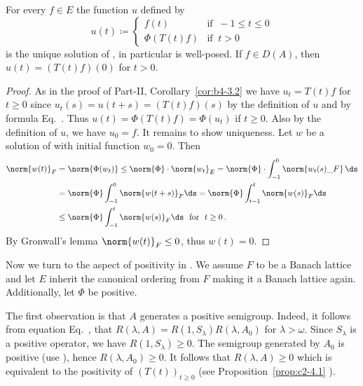 \begin{corollary}\label{cor:c4-3.2}
%
For every $f \in E$ the function $u$ defined by
\begin{equation}\label{eq:c4-3.5}
u(t) \coloneqq  \begin{cases}
    f(t) & \text{if } \ -1 \leq t \leq 0 \\
    \Phi(T(t)f) & \text{if } \ t > 0
\end{cases}
\end{equation}
is the unique solution of , in particular  is well-posed.
If\/ $f \in D(A)$, then $u(t) = (T(t)f)(0)$ for $t > 0$.
\end{corollary}
\begin{proof}
As in the proof of Part-II, Corollary~\ref{cor:b4-3.2} we have $u_t = T(t)f$ for $t \geq 0$ since $u_t(s) = u(t+s) = (T(t)f)(s)$ by the definition of\/ $u$ and by formula Eq.~.
Thus $u(t) = \Phi(T(t)f) = \Phi(u_t)$ if\/ $t \geq 0$.
Also by the definition of\/ $u$, we have $u_{0} = f$.
It remains to show uniqueness.
Let $w$ be a solution of  with initial function $w_{0} = 0$.
Then
\begin{align*}
\norm{w(t)}_F & = \norm{\Phi(w_{t})} \leq \norm{\Phi} \cdot  \norm{w_{t}}_{E} =  \norm{\Phi} \cdot \int_{-1}^{0} \norm{w_{t}(s)\_{F}} \, \ds \\
&=  \norm{\Phi} \int_{-1}^0 \norm{w(t+s)}_{F} \ds = \norm{\Phi} \int_{t-1}^{t} \norm{w(s)}_{F} \ds \\
&\leq \norm{\Phi} \int_{-1}^{t} \norm{w(s)}_{F} \ds \ \text{ for } \ t \geq 0\,.
\end{align*}
By Gronwall's lemma $\norm{w(t)}_F \leq 0$, thus $w(t) = 0$.
\end{proof}
Now we turn to the aspect of positivity in . We assume $F$ to be a Banach lattice and let $E$ inherit the canonical ordering from $F$ making it a Banach lattice again. Additionally, let $\Phi$ be positive.

The first observation is that $A$ generates a positive semigroup.
Indeed, it follows from equation Eq.~, that $R(\lambda,A) = R(1,S_\lambda)R(\lambda,A_{0})$ for $\lambda > \omega$. Since $S_\lambda$ is a positive operator, we have $R(1,S_\lambda) \geq 0$.
The semigroup generated by $A_{0}$ is positive (use ), hence $R(\lambda,A_{0}) \geq 0$.
It follows that $R(\lambda,A) \geq 0$ which is equivalent to the positivity of\/ $(T(t))_{t \geq 0}$ (see Proposition~\ref{prop:c2-4.1} ).

